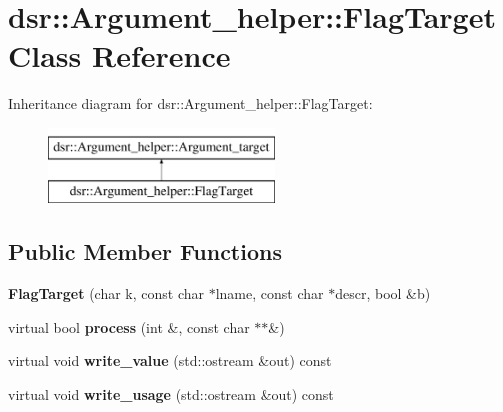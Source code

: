 \hypertarget{classdsr_1_1_argument__helper_1_1_flag_target}{
\section{dsr::Argument\_\-helper::FlagTarget Class Reference}
\label{classdsr_1_1_argument__helper_1_1_flag_target}
}
Inheritance diagram for dsr::Argument\_\-helper::FlagTarget:\begin{figure}[H]
\begin{center}
\leavevmode
\includegraphics[height=2.000000cm]{classdsr_1_1_argument__helper_1_1_flag_target}
\end{center}
\end{figure}
\subsection*{Public Member Functions}
\begin{DoxyCompactItemize}
\item 
\hypertarget{classdsr_1_1_argument__helper_1_1_flag_target_ae7389f3d11744d5f5dc30632f8f393cc}{
{\bfseries FlagTarget} (char k, const char $\ast$lname, const char $\ast$descr, bool \&b)}
\label{classdsr_1_1_argument__helper_1_1_flag_target_ae7389f3d11744d5f5dc30632f8f393cc}

\item 
\hypertarget{classdsr_1_1_argument__helper_1_1_flag_target_a9fe646d89cb09d86d0d95bd6d018b778}{
virtual bool {\bfseries process} (int \&, const char $\ast$$\ast$\&)}
\label{classdsr_1_1_argument__helper_1_1_flag_target_a9fe646d89cb09d86d0d95bd6d018b778}

\item 
\hypertarget{classdsr_1_1_argument__helper_1_1_flag_target_ae1ca137885097714ad4a7cc13d477e64}{
virtual void {\bfseries write\_\-value} (std::ostream \&out) const }
\label{classdsr_1_1_argument__helper_1_1_flag_target_ae1ca137885097714ad4a7cc13d477e64}

\item 
\hypertarget{classdsr_1_1_argument__helper_1_1_flag_target_a26dcc0b9897f36d961367c86911a550d}{
virtual void {\bfseries write\_\-usage} (std::ostream \&out) const }
\label{classdsr_1_1_argument__helper_1_1_flag_target_a26dcc0b9897f36d961367c86911a550d}

\end{DoxyCompactItemize}
